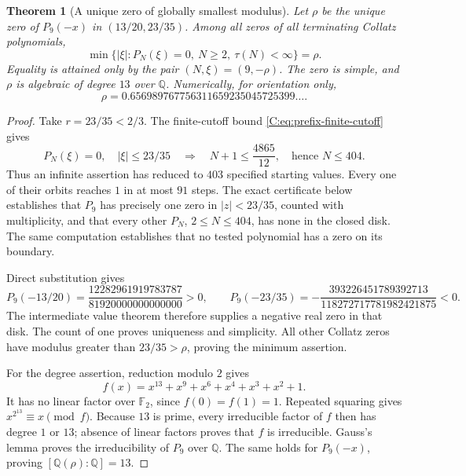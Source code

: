 \documentclass[11pt,a4paper]{article}
\newtheorem{theorem}{Theorem}[section]
\theoremstyle{definition}
\theoremstyle{remark}
\numberwithin{equation}{section}
\begin{document}
\begin{theorem}[A unique zero of globally smallest modulus]
\label{C:thm:globally-smallest-zero}
Let $\rho$ be the unique zero of $P_9(-x)$ in
$(13/20,23/35)$. Among all zeros of all terminating Collatz polynomials,
\[
 \min\{|\xi|: P_N(\xi)=0,\ N\ge2,\ \tau(N)<\infty\}=\rho.
\]
Equality is attained only by the pair $(N,\xi)=(9,-\rho)$.
The zero is simple, and $\rho$ is algebraic of degree $13$ over $\mathbb Q$.
Numerically, for orientation only,
\[
 \rho=0.656989767756311659235045725399\ldots.
\]
\end{theorem}

\begin{proof}
Take $r=23/35<2/3$. The finite-cutoff bound
\eqref{C:eq:prefix-finite-cutoff} gives
\[
 P_N(\xi)=0,\quad |\xi|\le23/35
 \quad\Longrightarrow\quad
 N+1\le\frac{4865}{12},\quad\text{hence }N\le404.
\]
Thus an infinite assertion has reduced to $403$ specified starting
values. Every one of their orbits reaches $1$ in at most $91$ steps.
The exact certificate below establishes that $P_9$ has precisely one
zero in $|z|<23/35$, counted with multiplicity, and that every other
$P_N$, $2\le N\le404$, has none in the closed disk.
The same computation establishes that no tested polynomial has a zero
on its boundary.

Direct substitution gives
\[
 P_9(-13/20)=\frac{12282961919783787}{81920000000000000}>0,
 \qquad
 P_9(-23/35)=-\frac{393226451789392713}
 {118272717781982421875}<0.
\]
The intermediate value theorem therefore supplies a negative real zero
in that disk. The count of one proves uniqueness and simplicity. All
other Collatz zeros have modulus greater than $23/35>\rho$, proving the
minimum assertion.

For the degree assertion, reduction modulo $2$ gives
\[
 f(x)=x^{13}+x^9+x^6+x^4+x^3+x^2+1.
\]
It has no linear factor over $\mathbb F_2$, since $f(0)=f(1)=1$.
Repeated squaring gives $x^{2^{13}}\equiv x\pmod f$.
Because $13$ is prime, every irreducible factor of $f$ then has degree
$1$ or $13$; absence of linear factors proves that $f$ is irreducible.
Gauss's lemma proves the irreducibility of $P_9$ over $\mathbb Q$.
The same holds for $P_9(-x)$, proving $[\mathbb Q(\rho):\mathbb Q]=13$.
\end{proof}
\end{document}

